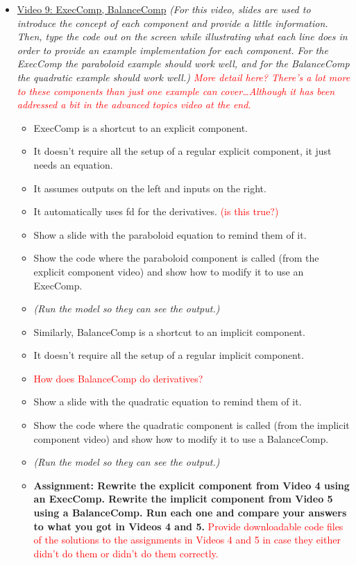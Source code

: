 \documentclass[12pt, letterpaper]{article}
\begin{document}
\begin{itemize}
	\item \underline{Video 9: ExecComp, BalanceComp} \textit{(For this video, slides are used to introduce the concept of each component and provide a little information. Then, type the code out on the screen while illustrating what each line does in order to provide an example implementation for each component. For the ExecComp the paraboloid example should work well, and for the BalanceComp the quadratic example should work well.) \textcolor{red}{More detail here? There’s a lot more to these components than just one example can cover…Although it has been addressed a bit in the advanced topics video at the end.}}
		\begin{itemize}
			\item ExecComp is a shortcut to an explicit component. 
			\item It doesn’t require all the setup of a regular explicit component, it just needs an equation.
			\item It assumes outputs on the left and inputs on the right. 
			\item It automatically uses fd for the derivatives. \textcolor{red}{(is this true?)}
			\item Show a slide with the paraboloid equation to remind them of it.
			\item Show the code where the paraboloid component is called (from the explicit component video) and show how to modify it to use an ExecComp.
			\item \textit{(Run the model so they can see the output.)}
			\item Similarly, BalanceComp is a shortcut to an implicit component.
			\item It doesn’t require all the setup of a regular implicit component.
			\item \textcolor{red}{How does BalanceComp do derivatives?}
			\item Show a slide with the quadratic equation to remind them of it.
			\item Show the code where the quadratic component is called (from the implicit component video) and show how to modify it to use a BalanceComp.
			\item \textit{(Run the model so they can see the output.)}
			\item \textbf{Assignment: Rewrite the explicit component from Video 4 using an ExecComp. Rewrite the implicit component from Video 5 using a BalanceComp. Run each one and compare your answers to what you got in Videos 4 and 5.} \textcolor{red}{Provide downloadable code files of the solutions to the assignments in Videos 4 and 5 in case they either didn't do them or didn't do them correctly.}
		\end{itemize}


\end{itemize}
\end{document}
